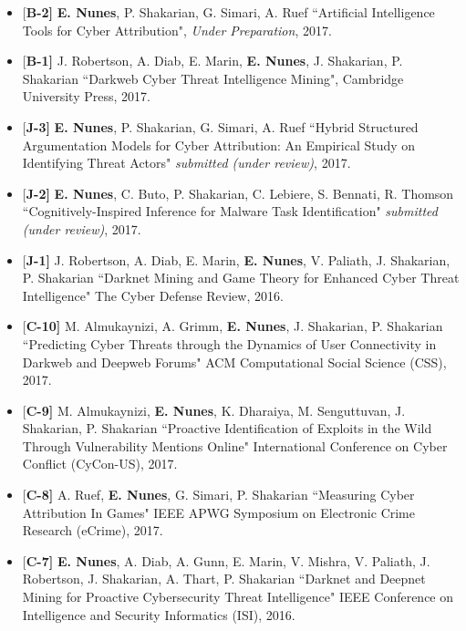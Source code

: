 \documentclass[margin,line]{CV}
\begin{document}
\begin{resume}
\begin{itemize}[leftmargin =*]

\item {[\bf B-2]}  {\bf E. Nunes}, P. Shakarian, G. Simari, A. Ruef ``Artificial Intelligence Tools for Cyber Attribution", {\em Under Preparation}, 2017. 

\item {[\bf B-1]} J. Robertson, A. Diab, E. Marin, {\bf E. Nunes}, J. Shakarian, P. Shakarian ``Darkweb Cyber Threat Intelligence Mining", Cambridge University Press, 2017. 

\item {[\bf J-3]} {\bf E. Nunes}, P. Shakarian, G. Simari, A. Ruef ``Hybrid Structured Argumentation Models for Cyber Attribution: An Empirical Study on Identifying Threat Actors" {\em submitted (under review)}, 2017.

\item {[\bf J-2]} {\bf E. Nunes}, C. Buto, P. Shakarian, C. Lebiere, S. Bennati, R. Thomson ``Cognitively-Inspired Inference for Malware Task Identification" {\em submitted (under review)}, 2017.

\item {[\bf J-1]} J. Robertson, A. Diab, E. Marin, {\bf E. Nunes}, V. Paliath, J. Shakarian, P. Shakarian ``Darknet Mining and Game Theory for Enhanced Cyber Threat Intelligence" The Cyber Defense Review, 2016.

\item {[\bf C-10]} M. Almukaynizi, A. Grimm, {\bf E. Nunes}, J. Shakarian, P. Shakarian  ``Predicting Cyber Threats through the Dynamics of User Connectivity in Darkweb and Deepweb Forums" ACM Computational Social Science (CSS), 2017.

\item {[\bf C-9]} M. Almukaynizi, {\bf E. Nunes}, K. Dharaiya, M. Senguttuvan, J. Shakarian, P. Shakarian  ``Proactive Identification of Exploits in the Wild Through Vulnerability Mentions Online" International Conference on Cyber Conflict (CyCon-US), 2017.


\item {[\bf C-8]} A. Ruef, {\bf E. Nunes}, G. Simari, P. Shakarian  ``Measuring Cyber Attribution In Games" IEEE APWG Symposium on Electronic Crime Research (eCrime), 2017.


\item {[\bf C-7]} {\bf E. Nunes}, A. Diab, A. Gunn, E. Marin, V. Mishra, V. Paliath, J. Robertson, J. Shakarian, A. Thart, P. Shakarian ``Darknet and Deepnet Mining for Proactive Cybersecurity Threat Intelligence" IEEE Conference on Intelligence and Security Informatics (ISI), 2016.


\end{itemize}
\end{resume}
\end{document}
